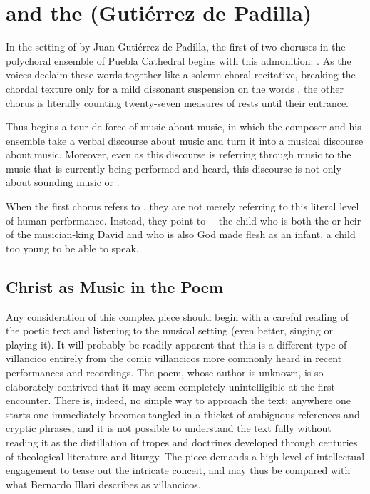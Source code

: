 
\section{ and the 
(Gutiérrez de Padilla)}

In the setting of  by Juan Gutiérrez de
Padilla, the first of two choruses in the polychoral ensemble of Puebla
Cathedral begins with this admonition: 
.
As the voices declaim these words together like a solemn choral recitative, 
breaking the chordal texture only for a mild dissonant suspension on the words
, the other chorus is literally counting
twenty-seven measures of rests until their entrance.

Thus begins a tour-de-force of music about music, in which the composer and his
ensemble take a verbal discourse about music and turn it into a musical
discourse about music.
Moreover, even as this discourse is referring through music to the music that is
currently being performed and heard, this discourse is not only about sounding
music or .

When the first chorus refers to , they are not merely
referring to this literal level of human performance.
Instead, they point to ---the child who is both
the  or heir of the musician-king David and who is also God made
flesh as an infant, a child too young to be able to speak.

\subsection{Christ as Music in the Poem}

Any consideration of this complex piece should begin with a careful reading of
the poetic text and listening to the musical setting (even better, singing or
playing it).%
    \autocite[\XXX]{Cashner:WLSCM-VCs}
It will probably be readily apparent that this is a different type of
villancico entirely from the comic villancicos more commonly heard in recent
performances and recordings.
The poem, whose author is unknown, is so elaborately contrived that it may seem
completely unintelligible at the first encounter. 
There is, indeed, no simple way to approach the text: anywhere one starts one
immediately becomes tangled in a thicket of ambiguous references and cryptic
phrases, and it is not possible to understand the text fully without reading it
as the distillation of tropes and doctrines developed through centuries of
theological literature and liturgy.
The piece demands a high level of intellectual engagement to tease out the
intricate conceit, and may thus be compared with what Bernardo Illari describes
as  villancicos.%
    \Autocite[vol.\ 2, 304--308]{Illari:Polychoral}

